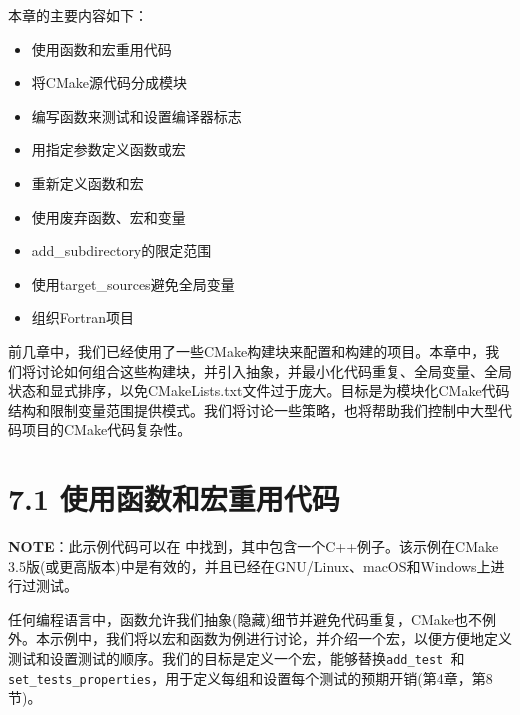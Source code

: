 本章的主要内容如下：

\begin{itemize}
\item 使用函数和宏重用代码

\item 将CMake源代码分成模块

\item 编写函数来测试和设置编译器标志

\item 用指定参数定义函数或宏

\item 重新定义函数和宏

\item 使用废弃函数、宏和变量

\item add\_subdirectory的限定范围

\item 使用target\_sources避免全局变量

\item 组织Fortran项目

\end{itemize}

前几章中，我们已经使用了一些CMake构建块来配置和构建的项目。本章中，我们将讨论如何组合这些构建块，并引入抽象，并最小化代码重复、全局变量、全局状态和显式排序，以免CMakeLists.txt文件过于庞大。目标是为模块化CMake代码结构和限制变量范围提供模式。我们将讨论一些策略，也将帮助我们控制中大型代码项目的CMake代码复杂性。


\section{7.1 使用函数和宏重用代码}

\begin{myInfoBox}
\textbf{NOTE}：此示例代码可以在  中找到，其中包含一个C++例子。该示例在CMake 3.5版(或更高版本)中是有效的，并且已经在GNU/Linux、macOS和Windows上进行过测试。
\end{myInfoBox}

任何编程语言中，函数允许我们抽象(隐藏)细节并避免代码重复，CMake也不例外。本示例中，我们将以宏和函数为例进行讨论，并介绍一个宏，以便方便地定义测试和设置测试的顺序。我们的目标是定义一个宏，能够替换\texttt{add\_test }和\texttt{set\_tests\_properties}，用于定义每组和设置每个测试的预期开销(第4章，第8节)。

